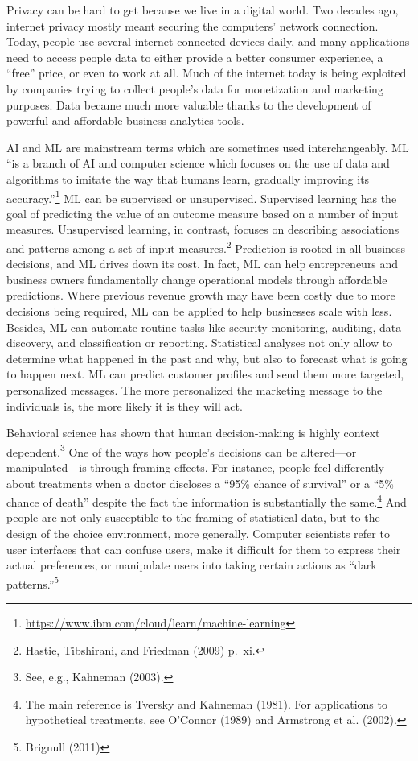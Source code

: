 \documentclass[
  11pt,
  letterpaper,
]{article}
\begin{document}
Privacy can be hard to get because we live in a digital world. Two decades ago, internet privacy mostly meant securing the computers' network connection. Today, people use several internet-connected devices daily, and many applications need to access people data to either provide a better consumer experience, a ``free'' price, or even to work at all. Much of the internet today is being exploited by companies trying to collect people's data for monetization and marketing purposes. Data became much more valuable thanks to the development of powerful and affordable business analytics tools.

AI and ML are mainstream terms which are sometimes used interchangeably. ML ``is a branch of AI and computer science which focuses on the use of data and algorithms to imitate the way that humans learn, gradually improving its accuracy.''\footnote{\url{https://www.ibm.com/cloud/learn/machine-learning}} ML can be supervised or unsupervised. Supervised learning has the goal of predicting the value of an outcome measure based on a number of input measures. Unsupervised learning, in contrast, focuses on describing associations and patterns among a set of input measures.\footnote{Hastie, Tibshirani, and Friedman (2009) p.~xi.} Prediction is rooted in all business decisions, and ML drives down its cost. In fact, ML can help entrepreneurs and business owners fundamentally change operational models through affordable predictions. Where previous revenue growth may have been costly due to more decisions being required, ML can be applied to help businesses scale with less. Besides, ML can automate routine tasks like security monitoring, auditing, data discovery, and classification or reporting. Statistical analyses not only allow to determine what happened in the past and why, but also to forecast what is going to happen next. ML can predict customer profiles and send them more targeted, personalized messages. The more personalized the marketing message to the individuals is, the more likely it is they will act.

Behavioral science has shown that human decision-making is highly context dependent.\footnote{See, e.g., Kahneman (2003).} One of the ways how people's decisions can be altered---or manipulated---is through framing effects. For instance, people feel differently about treatments when a doctor discloses a ``95\% chance of survival'' or a ``5\% chance of death'' despite the fact the information is substantially the same.\footnote{The main reference is Tversky and Kahneman (1981). For applications to hypothetical treatments, see O'Connor (1989) and Armstrong et al. (2002).} And people are not only susceptible to the framing of statistical data, but to the design of the choice environment, more generally. Computer scientists refer to user interfaces that can confuse users, make it difficult for them to express their actual preferences, or manipulate users into taking certain actions as ``dark patterns.''\footnote{Brignull (2011)}
\end{document}
